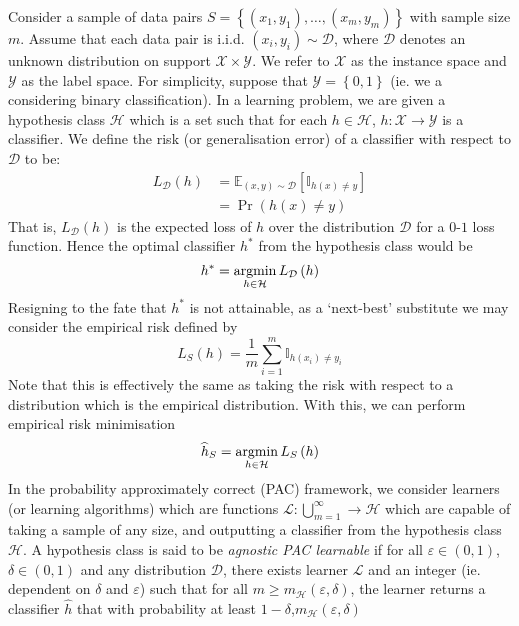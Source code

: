 \documentclass[11pt]{report} %
\begin{document}
Consider a sample of data pairs $S = \left\{\left(x_{1}, y_{1}\right), \dots, \left(x_{m}, y_{m}\right)\right\}$ with sample size $m$. Assume that each data pair is i.i.d. $\left(x_{i}, y_{i}\right) \sim \mathcal{D}$, where $\mathcal{D}$ denotes an unknown distribution on support $\mathcal{X}\times\mathcal{Y}$. We refer to $\mathcal{X}$ as the instance space and $\mathcal{Y}$ as the label space. For simplicity, suppose that $\mathcal{Y} = \left\{0, 1\right\}$ (ie. we a considering binary classification). In a learning problem, we are given a hypothesis class $\mathcal{H}$ which is a set such that for each $h \in \mathcal{H}$, $h: \mathcal{X} \to \mathcal{Y}$ is a classifier. We define the risk (or generalisation error) of a classifier with respect to $\mathcal{D}$ to be:
\begin{align}
L_{\mathcal{D}}\left(h\right) &= \mathbb{E}_{\left(x, y\right)\sim\mathcal{D}}\left[\mathbb{I}_{h\left(x\right) \neq y}\right] \\
&= \operatorname{Pr}\left(h\left(x\right) \neq y\right)
\end{align}
That is, $L_{\mathcal{D}}\left(h\right)$ is the expected loss of $h$ over the distribution $\mathcal{D}$ for a $0$-$1$ loss function. Hence the optimal classifier $h^{*}$ from the hypothesis class would be
\begin{equation}
h^{*} = \operatorname*{argmin}_{h \in \mathcal{H}}L_{\mathcal{D}}\left(h\right)
\end{equation}
Resigning to the fate that $h^{*}$ is not attainable, as a `next-best' substitute we may consider the empirical risk defined by
\begin{equation}
L_{S}\left(h\right) = \dfrac{1}{m}\sum_{i = 1}^{m}\mathbb{I}_{h\left(x_{i}\right) \neq y_{i}}
\end{equation}
Note that this is effectively the same as taking the risk with respect to a distribution which is the empirical distribution. With this, we can perform empirical risk minimisation
\begin{equation}
\widehat{h}_{S} = \operatorname*{argmin}_{h \in \mathcal{H}}L_{S}\left(h\right) 
\end{equation}
In the probability approximately correct (PAC) framework, we consider learners (or learning algorithms) which are functions $\mathcal{L}: \bigcup_{m = 1}^{\infty} \to \mathcal{H}$ which are capable of taking a sample of any size, and outputting a classifier from the hypothesis class $\mathcal{H}$. A hypothesis class is said to be \textit{agnostic PAC learnable} if for all $\varepsilon \in \left(0, 1\right)$, $\delta \in \left(0, 1\right)$ and any distribution $\mathcal{D}$, there exists learner $\mathcal{L}$ and an integer  (ie. dependent on $\delta$ and $\varepsilon$) such that for all $m \geq m_{\mathcal{H}}\left(\varepsilon, \delta\right)$, the learner returns a classifier $\widehat{h}$ that with probability at least $1 - \delta$,$m_{\mathcal{H}}\left(\varepsilon, \delta\right)$
\end{document}
